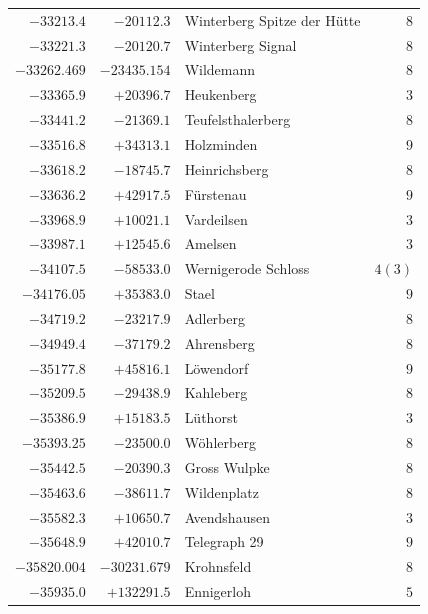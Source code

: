 \begin{center}
\begin{tabular}{r|r|p{170pt}|r}
\(-33213.4\)&\(-20112.3\)&Winterberg Spitze der Hütte&\(8\)\\
\(-33221.3\)&\(-20120.7\)&Winterberg Signal&\(8\)\\
\(-33262.469\)&\(-23435.154\)&Wildemann&\(8\)\\
\(-33365.9\)&\(+20396.7\)&Heukenberg&\(3\)\\
\(-33441.2\)&\(-21369.1\)&Teufelsthalerberg&\(8\)\\
\(-33516.8\)&\(+34313.1\)&Holzminden&\(9\)\\
\(-33618.2\)&\(-18745.7\)&Heinrichsberg&\(8\)\\
\(-33636.2\)&\(+42917.5\)&Fürstenau&\(9\)\\
\(-33968.9\)&\(+10021.1\)&Vardeilsen&\(3\)\\
\(-33987.1\)&\(+12545.6\)&Amelsen&\(3\)\\
\(-34107.5\)&\(-58533.0\)&Wernigerode Schloss&\(4 (3)\)\\
\(-34176.05\)&\(+35383.0\)&Stael&\(9\)\\
\(-34719.2\)&\(-23217.9\)&Adlerberg&\(8\)\\
\(-34949.4\)&\(-37179.2\)&Ahrensberg&\(8\)\\
\(-35177.8\)&\(+45816.1\)&Löwendorf&\(9\)\\
\(-35209.5\)&\(-29438.9\)&Kahleberg&\(8\)\\
\(-35386.9\)&\(+15183.5\)&Lüthorst&\(3\)\\
\(-35393.25\)&\(-23500.0\)&Wöhlerberg&\(8\)\\
\(-35442.5\)&\(-20390.3\)&Gross Wulpke&\(8\)\\
\(-35463.6\)&\(-38611.7\)&Wildenplatz&\(8\)\\
\(-35582.3\)&\(+10650.7\)&Avendshausen&\(3\)\\
\(-35648.9\)&\(+42010.7\)&Telegraph 29&\(9\)\\
\(-35820.004\)&\(-30231.679\)&Krohnsfeld&\(8\)\\
\(-35935.0\)&\(+132291.5\)&Ennigerloh&\(5\)\\
\hline\end{tabular}\endgroup\end{center}
